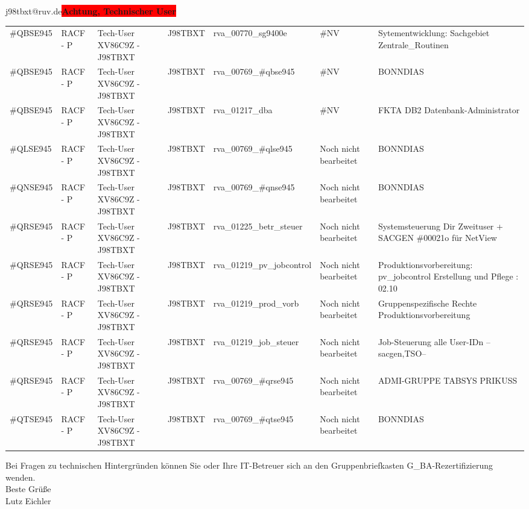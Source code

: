 \documentclass[a4paper,landscape,12pt]{letter}
\begin{document}
\begin{letter}{j98tbxt@ruv.de\space\space\space\space\space\space\space\space\space\bfseries\colorbox{red}{Achtung, Technischer User}\hfill \break}
\begin{tiny}
\begin{longtable}{|p{35mm}|p{15mm}|p{25mm}|p{10mm}|p{40mm}|p{50mm}|p{50mm}|}
\#QBSE945 & RACF - P & Tech-User XV86C9Z - J98TBXT & J98TBXT & rva\_00770\_sg9400e & \#NV & Sytementwicklung: Sachgebiet Zentrale\_Routinen \\
\#QBSE945 & RACF - P & Tech-User XV86C9Z - J98TBXT & J98TBXT & rva\_00769\_\#qbse945 & \#NV & BONNDIAS \\
\#QBSE945 & RACF - P & Tech-User XV86C9Z - J98TBXT & J98TBXT & rva\_01217\_dba & \#NV & FKTA DB2 Datenbank-Administrator \\
\#QLSE945 & RACF - P & Tech-User XV86C9Z - J98TBXT & J98TBXT & rva\_00769\_\#qlse945 & Noch nicht bearbeitet & BONNDIAS \\
\#QNSE945 & RACF - P & Tech-User XV86C9Z - J98TBXT & J98TBXT & rva\_00769\_\#qnse945 & Noch nicht bearbeitet & BONNDIAS \\
\#QRSE945 & RACF - P & Tech-User XV86C9Z - J98TBXT & J98TBXT & rva\_01225\_betr\_steuer & Noch nicht bearbeitet & Systemsteuerung Dir Zweituser + SACGEN \#00021o für NetView \\
\#QRSE945 & RACF - P & Tech-User XV86C9Z - J98TBXT & J98TBXT & rva\_01219\_pv\_jobcontrol & Noch nicht bearbeitet & Produktionsvorbereitung: pv\_jobcontrol Erstellung und Pflege : 02.10 \\
\#QRSE945 & RACF - P & Tech-User XV86C9Z - J98TBXT & J98TBXT & rva\_01219\_prod\_vorb & Noch nicht bearbeitet & Gruppenspezifische Rechte Produktionsvorbereitung \\
\#QRSE945 & RACF - P & Tech-User XV86C9Z - J98TBXT & J98TBXT & rva\_01219\_job\_steuer & Noch nicht bearbeitet & Job-Steuerung alle User-IDn --sacgen,TSO-- \\
\#QRSE945 & RACF - P & Tech-User XV86C9Z - J98TBXT & J98TBXT & rva\_00769\_\#qrse945 & Noch nicht bearbeitet & ADMI-GRUPPE TABSYS PRIKUSS \\
\#QTSE945 & RACF - P & Tech-User XV86C9Z - J98TBXT & J98TBXT & rva\_00769\_\#qtse945 & Noch nicht bearbeitet & BONNDIAS \\

\hline
		\end{longtable}
		\end{tiny}
	
\begin{minipage}{\textwidth}
			Bei Fragen zu technischen Hintergründen können Sie 
			oder Ihre IT-Betreuer sich an den Gruppenbriefkasten 
			G\_BA-Rezertifizierung
			wenden.\\
			\linebreak
			Beste Grüße\\
			Lutz Eichler
	\end{minipage}
	\end{letter}
	
\end{document}
